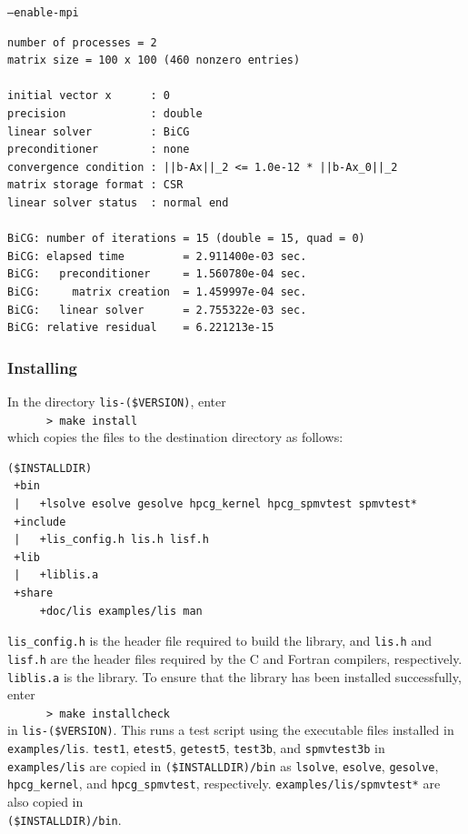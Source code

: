\documentclass[a4paper]{article}
\begin{document}
\begin{itemsquarebox}[l]{\tt --enable-mpi}
 \begin{minipage}{10cm}
 \begin{verbatim}
number of processes = 2
matrix size = 100 x 100 (460 nonzero entries)

initial vector x      : 0
precision             : double
linear solver         : BiCG
preconditioner        : none
convergence condition : ||b-Ax||_2 <= 1.0e-12 * ||b-Ax_0||_2
matrix storage format : CSR
linear solver status  : normal end

BiCG: number of iterations = 15 (double = 15, quad = 0)
BiCG: elapsed time         = 2.911400e-03 sec.
BiCG:   preconditioner     = 1.560780e-04 sec. 
BiCG:     matrix creation  = 1.459997e-04 sec.
BiCG:   linear solver      = 2.755322e-03 sec.
BiCG: relative residual    = 6.221213e-15
 \end{verbatim}
 \end{minipage}
\end{itemsquarebox}

\subsubsection{Installing}
In the directory {\tt lis-(\$VERSION)}, enter\\
 \verb+      > make install+\\
which copies the files to the destination directory as follows:

\begin{verbatim}
($INSTALLDIR)
 +bin
 |   +lsolve esolve gesolve hpcg_kernel hpcg_spmvtest spmvtest*
 +include
 |   +lis_config.h lis.h lisf.h
 +lib
 |   +liblis.a
 +share
     +doc/lis examples/lis man
\end{verbatim}

{\tt lis\_config.h} is the header file required to build the library, and 
{\tt lis.h} and {\tt lisf.h} are the header files required 
by the C and Fortran compilers, respectively. 
{\tt liblis.a} is the library.
To ensure that the library has been installed successfully, enter\\
 \verb+      > make installcheck+\\
in {\tt lis-(\$VERSION)}.
This runs a test script using the executable files installed 
in {\tt examples/lis}. 
{\tt test1}, {\tt etest5}, {\tt getest5}, {\tt test3b}, and {\tt spmvtest3b} 
in {\tt examples/lis} 
are copied in {\tt (\$INSTALLDIR)/bin} as {\tt lsolve}, {\tt esolve}, 
{\tt gesolve}, {\tt hpcg\_kernel}, and {\tt hpcg\_spmvtest}, respectively.
{\tt examples/lis/spmvtest*} are also copied in \\
{\tt (\$INSTALLDIR)/bin}.
\end{document}
